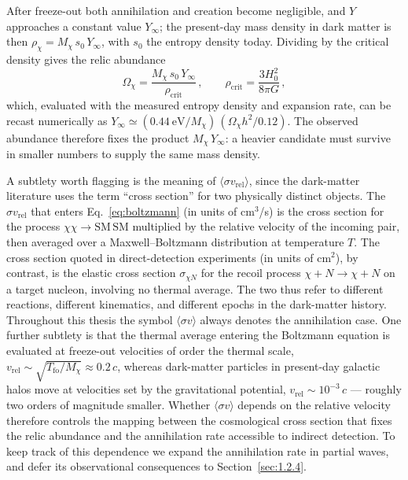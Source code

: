 After freeze-out both annihilation and creation become negligible, and $Y$ approaches a constant value $Y_\infty$; the present-day mass density in dark matter is then $\rho_\chi = M_\chi\, s_0\, Y_\infty$, with $s_0$ the entropy density today.
Dividing by the critical density gives the relic abundance
\begin{equation}
	\Omega_\chi = \frac{M_\chi\, s_0\, Y_\infty}{\rho_\mathrm{crit}}\,, \qquad \rho_\mathrm{crit} = \frac{3 H_0^2}{8\pi G}\,,
	\label{eq:omega_Y}
\end{equation}
which, evaluated with the measured entropy density and expansion rate, can be recast numerically as $Y_\infty \simeq (0.44~\mathrm{eV}/M_\chi)\,(\Omega_\chi h^2/0.12)$.
The observed abundance therefore fixes the product $M_\chi\, Y_\infty$: a heavier candidate must survive in smaller numbers to supply the same mass density.

A subtlety worth flagging is the meaning of $\langle \sigma v_\mathrm{rel}\rangle$, since the dark-matter literature uses the term ``cross section'' for two physically distinct objects.
The $\sigma v_\mathrm{rel}$ that enters Eq.~\eqref{eq:boltzmann} (in units of cm$^3$/s) is the cross section for the process $\chi\chi \to \mathrm{SM}\,\mathrm{SM}$ multiplied by the relative velocity of the incoming pair, then averaged over a Maxwell--Boltzmann distribution at temperature $T$.
The cross section quoted in direct-detection experiments (in units of cm$^2$), by contrast, is the elastic cross section $\sigma_{\chi N}$ for the recoil process $\chi + N \to \chi + N$ on a target nucleon, involving no thermal average.
The two thus refer to different reactions, different kinematics, and different epochs in the dark-matter history.
Throughout this thesis the symbol $\langle \sigma v\rangle$ always denotes the annihilation case.
One further subtlety is that the thermal average entering the Boltzmann equation is evaluated at freeze-out velocities of order the thermal scale, $v_\mathrm{rel} \sim \sqrt{T_\mathrm{fo}/M_\chi} \approx 0.2\,c$, whereas dark-matter particles in present-day galactic halos move at velocities set by the gravitational potential, $v_\mathrm{rel} \sim 10^{-3}\,c$ --- roughly two orders of magnitude smaller.
Whether $\langle \sigma v \rangle$ depends on the relative velocity therefore controls the mapping between the cosmological cross section that fixes the relic abundance and the annihilation rate accessible to indirect detection.
To keep track of this dependence we expand the annihilation rate in partial waves, and defer its observational consequences to Section~\ref{sec:1.2.4}.

